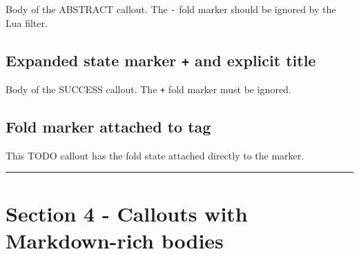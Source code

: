 \begin{tcolorbox}[breakable,colback=ocGryBack,colframe=ocGryFrame,coltitle=ocGryTitle,left=3mm,boxed title style={left=1mm},title={\hspace*{-2.5mm}\iconInfo\; md2pdf - inner with explicit \texttt{shift-heading=0}}]
\begin{tcolorbox}[breakable,colback=ocGryBack,colframe=ocGryFrame,coltitle=ocGryTitle,left=3mm,boxed title style={left=1mm},title={\hspace*{-2.5mm}\iconTldr\; Abstract with fold marker}]

Body of the ABSTRACT callout. The \texttt{-} fold marker should be
ignored by the Lua filter.

\end{tcolorbox}

\subsection*{\texorpdfstring{Expanded state marker \texttt{+} and
explicit
title}{Expanded state marker + and explicit title}}\label{inner-3-expanded-state-marker-and-explicit-title}

\begin{tcolorbox}[breakable,colback=ocGreBack,colframe=ocGreFrame,coltitle=ocGreTitle,left=3mm,boxed title style={left=1mm},title={\hspace*{-2.5mm}\iconCheck\; Title with plus marker}]

Body of the SUCCESS callout. The \texttt{+} fold marker must be ignored.

\end{tcolorbox}

\subsection*{Fold marker attached to
tag}\label{inner-3-fold-marker-attached-to-tag}

\begin{tcolorbox}[breakable,colback=yellow!5!white,colframe=yellow!50!black,left=3mm,boxed title style={left=1mm},title={\hspace*{-2.5mm}\iconTodo\; TODO}]

This TODO callout has the fold state attached directly to the marker.

\end{tcolorbox}

\begin{center}\rule{0.5\linewidth}{0.5pt}\end{center}

\section*{Section 4 - Callouts with Markdown-rich
bodies}\label{inner-3-section-4---callouts-with-markdown-rich-bodies}


\end{tcolorbox}
